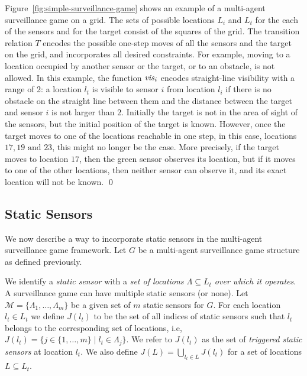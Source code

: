 \begin{example}\label{ex:simple-surveillance-game}
Figure~\ref{fig:simple-surveillance-game} shows an example of a multi-agent surveillance game on a grid.  The sets of possible locations $L_i$ and $L_t$ for the each of the sensors and for the target consist of the squares of the  grid. The transition relation $T$ encodes the possible one-step moves of all the sensors and the target on the grid, and incorporates all desired constraints. For example, moving to a location occupied by another sensor or the target, or to an obstacle, is not allowed.
In this example, the function $\mathit{vis}_i$ encodes straight-line visibility with a range of 2: a location $l_t$ is visible to sensor $i$ from location $l_i$ if there is no obstacle on the straight line between them and the distance between the target and sensor $i$ is not larger than 2. Initially the target is not in the area of sight of the sensors, but the initial position of the target is known. However, once the target moves to one of the locations reachable in one step, in this case, locations $17,19 \text{ and } 23$, this might no longer be the case. More precisely, if the target moves to location $17$, then the green sensor observes its location, but if it moves to one of the other locations, then neither sensor can observe it, and its exact location will not be known. \qed
\end{example}


\subsection{Static Sensors}
We now describe a way to incorporate static sensors in the multi-agent surveillance game framework. Let $G$ be a multi-agent surveillance game structure as defined previously.  

We identify a \emph{static sensor} with a \emph{set of locations $\Lambda \subseteq L_t$ over which it operates}. 
A surveillance game can have multiple static sensors (or none). Let $\mathcal{M} = \{\Lambda_1,\dots,\Lambda_m\}$ be a given set of $m$ static sensors for $G$. For each location $l_t \in L_t$ we define  $J(l_t)$ to be the set of all indices of static sensors such that $l_t$ belongs to the corresponding set of locations, i.e, $J(l_t) = \{j \in \{1,\ldots,m\}\mid l_t\in \Lambda_j\}$. We refer to $J(l_t)$ as the set of \emph{triggered static sensors} at location $l_t$. We also define $J(L) = \bigcup_{l_t \in L} J(l_t)$ for a set of locations $L \subseteq L_t$. 

